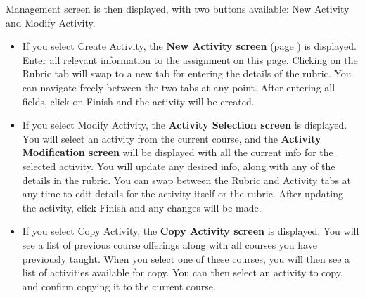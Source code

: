 \documentclass{article}
\begin{document}
\begin{itemize}
\begin{itemize}
{			Management screen} is then displayed, with two buttons available: New 
			Activity and Modify Activity.
		\begin{itemize}
			\item If you select Create Activity, the \textbf{New Activity screen} 
				(page \pageref{newActivity}) is displayed.
				Enter all relevant information to the assignment on this page. Clicking on
				the Rubric tab will swap to a new tab for entering the details of the rubric.
				You can navigate freely between the two tabs at any point. After entering
				all fields, click on Finish and the activity will be created.
			\item If you select Modify Activity, the \textbf{Activity Selection screen} is
				displayed. You will select an activity from the current course, and the
				\textbf{Activity Modification screen} will be displayed with all the current
				info for the selected activity. You will update any desired info, along with
				any of the details in the rubric. You can swap between the Rubric and 
				Activity tabs at any time to edit details for the activity itself or the rubric.
				After updating the activity, click Finish and any changes will be made.
			\item If you select Copy Activity, the \textbf{Copy Activity screen} is displayed.
				You will see a list of previous course offerings along with all courses you
				have previously taught. When you select one of these courses, you will
				then see a list of activities available for copy. You can then select an
				activity to copy, and confirm copying it to the current course.
		\end{itemize}
	\end{itemize}
\end{itemize}
\end{document}
